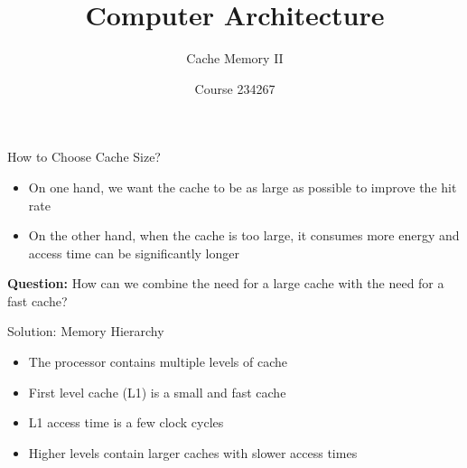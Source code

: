\documentclass[aspectratio=169,12pt]{beamer}
\title{Computer Architecture}
\subtitle{Cache Memory II}
\author{Course 234267}
\date{}
\begin{document}
\frame{\titlepage}

\begin{frame}{How to Choose Cache Size?}
\begin{itemize}
    \item On one hand, we want the cache to be as large as possible to improve the hit rate
    \item On the other hand, when the cache is too large, it consumes more energy and access time can be significantly longer
\end{itemize}
\vspace{0.5cm}
\centering
\textbf{Question:} How can we combine the need for a large cache with the need for a fast cache?
\end{frame}

\begin{frame}{Solution: Memory Hierarchy}
\begin{itemize}
    \item The processor contains multiple levels of cache
    \item First level cache (L1) is a small and fast cache
    \item L1 access time is a few clock cycles
    \item Higher levels contain larger caches with slower access times
\end{itemize}
\vspace{0.5cm}
\begin{center}
\end{center}
\end{frame}
\end{document}

